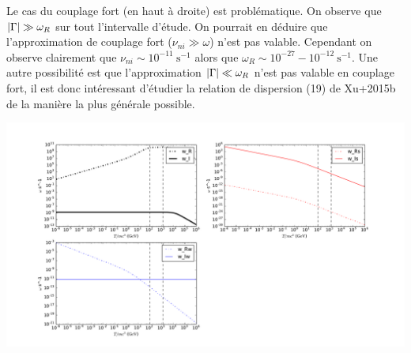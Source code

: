 \documentclass[10pt,a4paper]{article}
\begin{document}
Le cas du couplage fort (en haut à droite) est problématique. On observe que $\abs{\Gamma} \gg \omega_R$ sur tout l'intervalle d'étude. On pourrait en déduire que l'approximation de couplage fort ($\nu_{ni} \gg \omega$) n'est pas valable. Cependant on observe clairement que $\nu_{ni} \sim 10^{-11} ~ \mathrm{s}^{-1}$ alors que $\omega_R \sim 10^{-27} - 10^{-12}~\mathrm{s}^{-1}$. Une autre possibilité est que l'approximation $\abs{\Gamma} \ll \omega_R$ n'est pas valable en couplage fort, il est donc intéressant d'étudier la relation de dispersion (19) de Xu+2015b de la manière la plus générale possible. 

\begin{center}
	\includegraphics[scale=0.4]{./figures/WNM_dispersion.pdf}
	\label{fig:disp_WNM}
\end{center}
\end{document}
